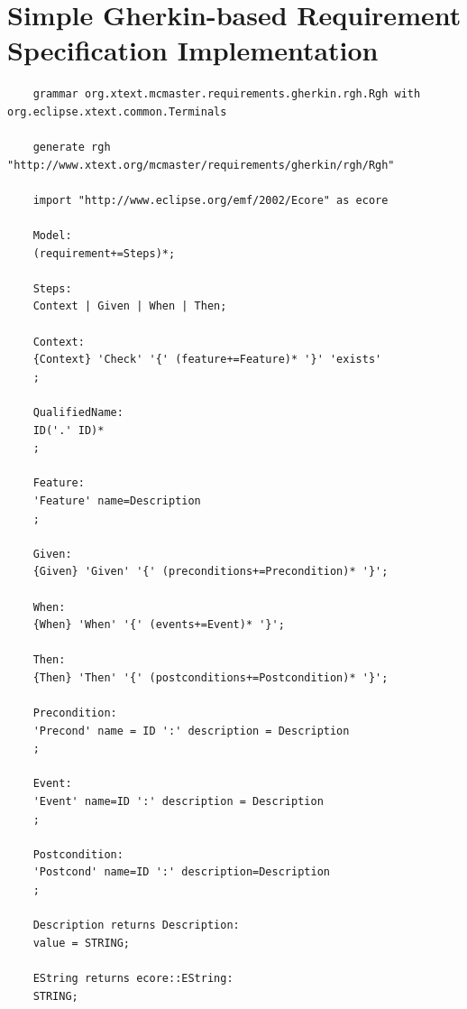 \section{Simple Gherkin-based Requirement Specification Implementation}
\label{apdx:rgh_spec}
\begin{lstlisting}
	grammar org.xtext.mcmaster.requirements.gherkin.rgh.Rgh with org.eclipse.xtext.common.Terminals
	
	generate rgh "http://www.xtext.org/mcmaster/requirements/gherkin/rgh/Rgh"
	
	import "http://www.eclipse.org/emf/2002/Ecore" as ecore
	
	Model:
	(requirement+=Steps)*;
	
	Steps:
	Context | Given | When | Then;
	
	Context:
	{Context} 'Check' '{' (feature+=Feature)* '}' 'exists'
	;
	
	QualifiedName:
	ID('.' ID)*
	;
	
	Feature:
	'Feature' name=Description
	;
	
	Given:
	{Given} 'Given' '{' (preconditions+=Precondition)* '}';
	
	When:
	{When} 'When' '{' (events+=Event)* '}';
	
	Then:
	{Then} 'Then' '{' (postconditions+=Postcondition)* '}';
	
	Precondition:
	'Precond' name = ID ':' description = Description
	;
	
	Event:
	'Event' name=ID ':' description = Description
	;
	
	Postcondition:
	'Postcond' name=ID ':' description=Description
	;
	
	Description returns Description:
	value = STRING;
	
	EString returns ecore::EString:
	STRING;
\end{lstlisting}

